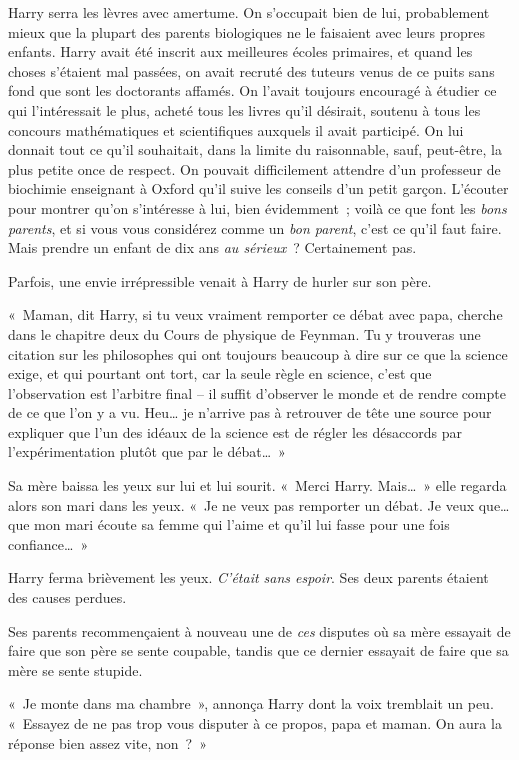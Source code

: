 Harry serra les lèvres avec amertume. On s'occupait bien de lui, probablement mieux que la plupart des parents biologiques ne le faisaient avec leurs propres enfants. Harry avait été inscrit aux meilleures écoles primaires, et quand les choses s'étaient mal passées, on avait recruté des tuteurs venus de ce puits sans fond que sont les doctorants affamés. On l'avait toujours encouragé à étudier ce qui l'intéressait le plus, acheté tous les livres qu'il désirait, soutenu à tous les concours mathématiques et scientifiques auxquels il avait participé. On lui donnait tout ce qu'il souhaitait, dans la limite du raisonnable, sauf, peut-être, la plus petite once de respect. On pouvait difficilement attendre d'un professeur de biochimie enseignant à Oxford qu'il suive les conseils d'un petit garçon. L'écouter pour montrer qu'on s'intéresse à lui, bien évidemment~; voilà ce que font les \emph{bons parents}, et si vous vous considérez comme un \emph{bon parent}, c'est ce qu'il faut faire. Mais prendre un enfant de dix ans \emph{au sérieux}~? Certainement pas.

Parfois, une envie irrépressible venait à Harry de hurler sur son père.

«~Maman, dit Harry, si tu veux vraiment remporter ce débat avec papa, cherche dans le chapitre deux du Cours de physique de Feynman. Tu y trouveras une citation sur les philosophes qui ont toujours beaucoup à dire sur ce que la science exige, et qui pourtant ont tort, car la seule règle en science, c'est que l'observation est l'arbitre final -- il suffit d'observer le monde et de rendre compte de ce que l'on y a vu. Heu… je n'arrive pas à retrouver de tête une source pour expliquer que l'un des idéaux de la science est de régler les désaccords par l'expérimentation plutôt que par le débat…~»

Sa mère baissa les yeux sur lui et lui sourit. «~Merci Harry.  Mais…~» elle regarda alors son mari dans les yeux. «~Je ne veux pas remporter un débat. Je veux que… que mon mari écoute sa femme qui l'aime et qu'il lui fasse pour une fois confiance…~»

Harry ferma brièvement les yeux. \emph{C'était sans espoir}. Ses deux parents étaient des causes perdues.

Ses parents recommençaient à nouveau une de \emph{ces} disputes où sa mère essayait de faire que son père se sente coupable, tandis que ce dernier essayait de faire que sa mère se sente stupide.

«~Je monte dans ma chambre~», annonça Harry dont la voix tremblait un peu. «~Essayez de ne pas trop vous disputer à ce propos, papa et maman.  On aura la réponse bien assez vite, non~?~»

